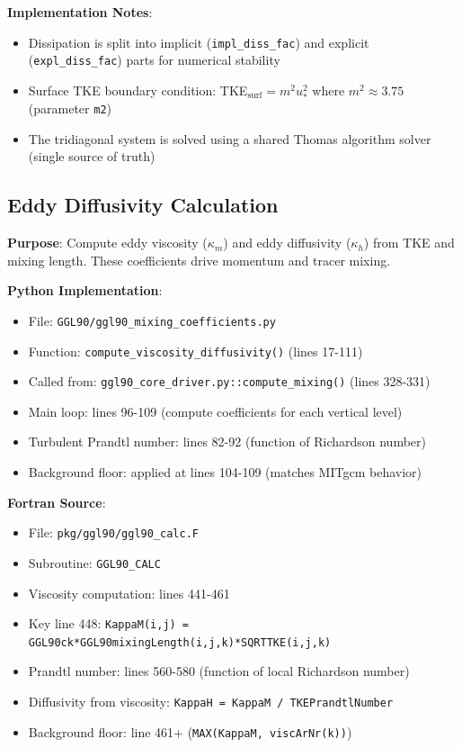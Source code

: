 \documentclass[11pt]{article}
\begin{document}
\textbf{Implementation Notes}:
\begin{itemize}
    \item Dissipation is split into implicit (\verb|impl_diss_fac|) and explicit (\verb|expl_diss_fac|) parts for numerical stability
    \item Surface TKE boundary condition: TKE$_{\text{surf}} = m^2 u_*^2$ where $m^2 \approx 3.75$ (parameter \verb|m2|)
    \item The tridiagonal system is solved using a shared Thomas algorithm solver (single source of truth)
\end{itemize}

\subsection{Eddy Diffusivity Calculation}

\textbf{Purpose}: Compute eddy viscosity ($\kappa_m$) and eddy diffusivity ($\kappa_h$) from TKE and mixing length. These coefficients drive momentum and tracer mixing.

\textbf{Python Implementation}:
\begin{itemize}
    \item File: \verb|GGL90/ggl90_mixing_coefficients.py|
    \item Function: \verb|compute_viscosity_diffusivity()| (lines 17-111)
    \item Called from: \verb|ggl90_core_driver.py::compute_mixing()| (lines 328-331)
    \item Main loop: lines 96-109 (compute coefficients for each vertical level)
    \item Turbulent Prandtl number: lines 82-92 (function of Richardson number)
    \item Background floor: applied at lines 104-109 (matches MITgcm behavior)
\end{itemize}

\textbf{Fortran Source}:
\begin{itemize}
    \item File: \verb|pkg/ggl90/ggl90_calc.F|
    \item Subroutine: \verb|GGL90_CALC|
    \item Viscosity computation: lines 441-461
    \item Key line 448: \verb|KappaM(i,j) = GGL90ck*GGL90mixingLength(i,j,k)*SQRTTKE(i,j,k)|
    \item Prandtl number: lines 560-580 (function of local Richardson number)
    \item Diffusivity from viscosity: \verb|KappaH = KappaM / TKEPrandtlNumber|
    \item Background floor: line 461+ (\verb|MAX(KappaM, viscArNr(k))|)
\end{itemize}
\end{document}
